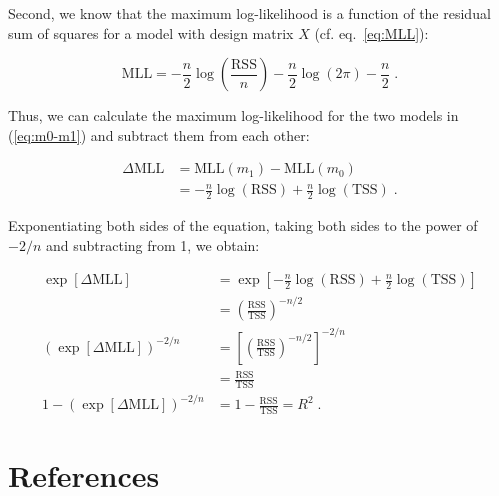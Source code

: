 \documentclass[a4paper,12pt]{article}
\begin{document}
Second, we know that the maximum log-likelihood is a function of the residual sum of squares for a model with design matrix $X$ (cf. eq.~\ref{eq:MLL}):

\begin{equation} \label{eq:MLL-RSS}
\mathrm{MLL} = - \frac{n}{2} \log\left( \frac{\mathrm{RSS}}{n} \right) - \frac{n}{2} \log(2\pi) - \frac{n}{2} \; .
\end{equation}

Thus, we can calculate the maximum log-likelihood for the two models in (\ref{eq:m0-m1}) and subtract them from each other:

\vspace{-0.5em}
\begin{equation} \label{eq:dMLL}
\begin{split}
\Delta\mathrm{MLL} &= \mathrm{MLL}(m_1) - \mathrm{MLL}(m_0) \\
&= - \frac{n}{2} \log(\mathrm{RSS}) + \frac{n}{2} \log(\mathrm{TSS}) \; .
\end{split}
\end{equation}

Exponentiating both sides of the equation, taking both sides to the power of $-2/n$ and subtracting from 1, we obtain:

\vspace{-0.5em}
\begin{equation} \label{eq:MLL-R2}
\begin{split}
\exp[\Delta\mathrm{MLL}] &= \exp\left[ - \frac{n}{2} \log(\mathrm{RSS}) + \frac{n}{2} \log(\mathrm{TSS}) \right] \\
&= \left( \frac{\mathrm{RSS}}{\mathrm{TSS}} \right)^{-n/2} \\
\left( \exp[\Delta\mathrm{MLL}] \right)^{-2/n} &= \left[ \left( \frac{\mathrm{RSS}}{\mathrm{TSS}} \right)^{-n/2} \right]^{-2/n} \\
&= \frac{\mathrm{RSS}}{\mathrm{TSS}} \\
1 - \left( \exp[\Delta\mathrm{MLL}] \right)^{-2/n} &= 1 - \frac{\mathrm{RSS}}{\mathrm{TSS}} = R^2 \; .
\end{split}
\end{equation}



\pagebreak
{}
\section{References}
\renewcommand{\section}[2]{}

\nocite{*}


\end{document}
